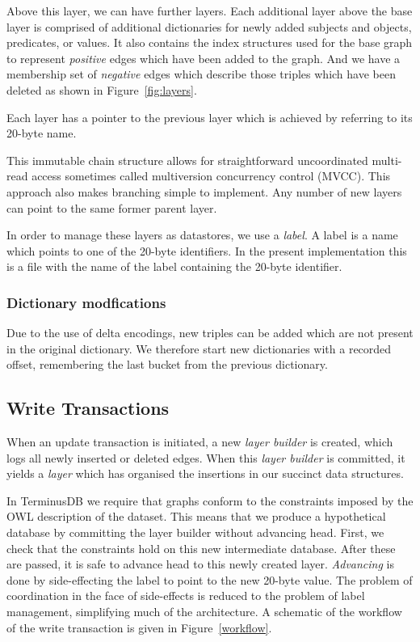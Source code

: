 \documentclass[10pt, a4paper, twocolumn]{article} %
\begin{document}
Above this layer, we can have further layers. Each additional layer
above the base layer is comprised of additional dictionaries for newly
added subjects and objects, predicates, or values. It also contains the
index structures used for the base graph to represent {\em positive}
edges which have been added to the graph. And we have a membership set
of {\em negative} edges which describe those triples which have been
deleted as shown in Figure~\ref{fig:layers}.

Each layer has a pointer to the previous layer which is achieved by
referring to its 20-byte name.

This immutable chain structure allows for straightforward uncoordinated
multi-read access sometimes called multiversion concurrency control
(MVCC)\cite{Mohan:1992:EFM:130283.130306}\cite{Sadoghi:2014:RDL:2733004.2733006}. This
approach also makes branching simple to implement. Any number of new
layers can point to the same former parent layer.

In order to manage these layers as datastores, we use a {\em label}. A
label is a name which points to one of the 20-byte identifiers. In the
present implementation this is a file with the name of the label
containing the 20-byte identifier.

\subsubsection{Dictionary modfications}

Due to the use of delta encodings, new triples can be added which are
not present in the original dictionary. We therefore start new
dictionaries with a recorded offset, remembering the last bucket from
the previous dictionary.

\subsection{Write Transactions}

When an update transaction is initiated, a new {\em layer builder} is
created, which logs all newly inserted or deleted edges. When this
{\em layer builder} is committed, it yields a {\em layer} which has
organised the insertions in our succinct data structures.

In TerminusDB we require that graphs conform to the constraints
imposed by the OWL description of the dataset. This means that we
produce a hypothetical database by committing the layer builder
without advancing head. First, we check that the constraints hold on this
new intermediate database. After these are passed, it is safe to
advance head to this newly created layer. {\em Advancing} is done by
side-effecting the label to point to the new 20-byte value. The
problem of coordination in the face of side-effects is reduced to the
problem of label management, simplifying much of the architecture. A
schematic of the workflow of the write transaction is given in
Figure~\ref{workflow}.
\end{document}
